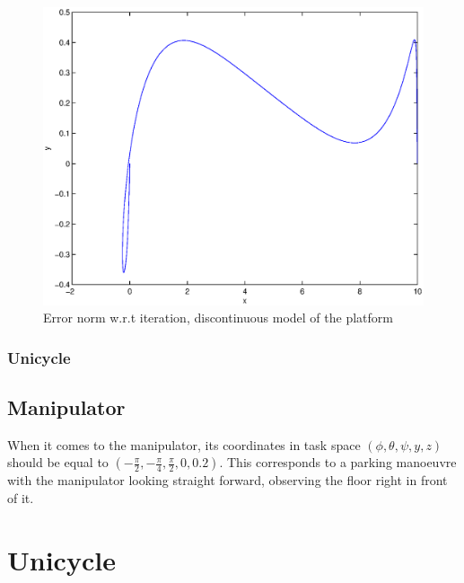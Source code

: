 \begin{figure}[htp]
\centering
\includegraphics[height=0.3\textheight]{img/final_15_1_10_path.eps} %
\caption{Error norm w.r.t iteration, discontinuous model of the platform}
\label{fig:error_discont}
\end{figure}


\subsubsection{Unicycle}

\subsection{Manipulator}
When it comes to the manipulator,
its coordinates in task space $(\phi, \theta, \psi, y, z) $ should be equal to
$(-\frac{\pi}{2}, -\frac{\pi}{4}, \frac{\pi}{2}, 0, 0.2)$.
This corresponds to a parking manoeuvre with the manipulator
looking straight forward, observing the floor right in front of it.
\section{Unicycle}